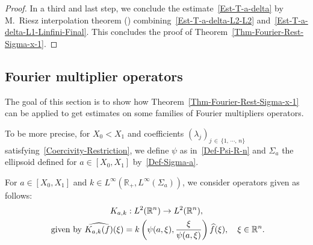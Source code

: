 \documentclass[10pt]{amsart}
\theoremstyle{definition}\newtheorem{defi}[theo]{Definition}\newtheorem{rema}[theo]{Remark}\newtheorem{exam}[theo]{Example}\newtheorem{exem}[theo]{Example}\newtheorem{nota}[theo]{Notation}
\newcommand*\R{\mathbb{R}}
\renewcommand{\hat}{\widehat}
\let\oldhat\hat
\renewcommand*{\hat}[1]{\mathchoice{\widehat{#1}}{\widehat{#1}}{\oldhat{#1}}{\oldhat{#1}}}
\begin{document}
\begin{proof}
In a third and last step, we conclude the estimate~\eqref{Est-T-a-delta} by M.~Riesz interpolation theorem (\cite[Theorem~0.1.13]{sogge2017fourier}) combining~\eqref{Est-T-a-delta-L2-L2} and~\eqref{Est-T-a-delta-L1-Linfini-Final}. This concludes the proof of Theorem~\ref{Thm-Fourier-Rest-Sigma-x-1}.
\end{proof}


\subsection{Fourier multiplier operators}\label{Subsec-Fourier-Multipliers}

The goal of this section is to show how Theorem~\ref{Thm-Fourier-Rest-Sigma-x-1} can be applied to get estimates on some families of Fourier multipliers operators.

To be more precise, for $X_0 <X_1$ and coefficients $(\lambda_j)_{j\, \in\,\{1,\, \cdots,\,n\}}$ satisfying~\eqref{Coercivity-Restriction}, we define $\psi$ as in~\eqref{Def-Psi-R-n} and $\Sigma_a$ the ellipsoid defined for $a \in [X_0,X_1]$ by~\eqref{Def-Sigma-a}.

For $a \in [X_0, X_1]$ and $k \in L^\infty(\R_+, L^\infty(\Sigma_a))$, we consider operators given as follows:
\begin{multline}\label{Class-Fourier-Multipliers}
K_{a,k} : L^2(\R^n) \to L^2(\R^n),\\
\text{ given by }
\widehat{K_{a,k}(f)} (\xi) = k\left(\psi(a,\xi),\frac{\xi}{\psi(a,\xi)} \right)
\hat f(\xi),
\quad \xi \in \R^n.
\end{multline}
\end{document}
